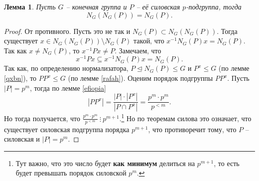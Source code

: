 \documentclass{article}
\newtheorem{lemma}{Лемма}[section]
\begin{document}
\begin{lemma} \label{tiffany}
    Пусть $G$ -- конечная группа и $P$ -- её силовская $p$-подгруппа, тогда $$ N_G(N_G(P)) = N_G(P). $$
\end{lemma}
\begin{proof}
    От противного. Пусть это не так и $N_G(P) \subset N_G(N_G(P))$. Тогда существует $x \in N_G(N_G(P)) \setminus N_G(P)$ такой, что $x^{-1} N_G(P) x = N_G(P)$.
    Так как $x \neq N_G(P)$, то $x^{-1} P x \neq P$. Замечаем, что
    \[
        x^{-1} P x \subseteq x^{-1} N_G(P) x = N_G(P).
    \]
    Так как, по определению нормализатора, $P \trianglelefteq N_G(P) \leqslant G$ и $P^x \leqslant G$ (по лемме \ref{qxbn}), то $P P^x \leqslant G$ (по лемме \ref{rafah}).
    Оценим порядок подгруппы $P P^x$. Пусть $|P| = p^m$, тогда по лемме \ref{efiopia}
    \[
        |P P^x| = \frac{|P| \cdot |P^x|}{|P \cap P^x|} = \frac{p^m \cdot p^m}{p^{<m}}.
    \]
    Но тогда получается, что $\frac{p^m \cdot p^m}{p^{<m}} \ \vdots \ p^{m + 1}$.\footnote{Тут важно, что это число будет \textbf{как минимум} делиться на $p^{m + 1}$, то есть будет превышать порядок силовской $p^m$.} Но по теоремам силова это означает, что существует силовская подгруппа порядка $p^{m + 1}$, что противоречит тому, что $P$ -- силовская и $|P| = p^m$.
\end{proof}
\end{document}

